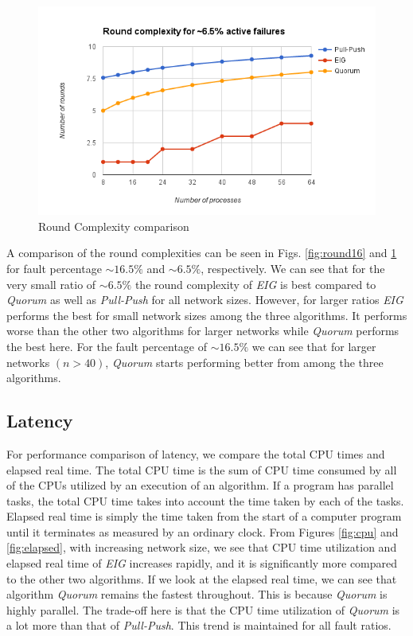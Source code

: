 \begin{figure}[ht] \centering \includegraphics[scale=0.4]{Round6}
    \caption{Round Complexity comparison} \label{fig:round6}
    \vspace{-4mm}
    \end{figure}

A comparison of the round complexities can be seen in Figs. \ref{fig:round16}
and \ref{fig:round6} for fault percentage $\mathtt{\sim}16.5\%$ and
$\mathtt{\sim}6.5\%$, respectively. We can see that for the very small ratio of
$\mathtt{\sim}6.5\%$ the round complexity of \textit{EIG} is best compared to
\textit{Quorum} as well as \textit{Pull-Push} for all network sizes. However,
for larger ratios \textit{EIG} performs the best for small network sizes among
the three algorithms. It performs worse than the other two algorithms for
larger networks while \textit{Quorum} performs the best here.  For the fault
percentage of $\mathtt{\sim}16.5\%$ we can see that for larger networks $(n
> 40)$, \textit{Quorum} starts performing better from among the three
algorithms.


\subsection{Latency}

For performance comparison of latency, we compare the total CPU times and
elapsed real time.  The total CPU time is the sum of CPU time consumed by all
of the CPUs utilized by an execution of an algorithm. If a program has parallel
tasks, the total CPU time takes into account the time taken by each of the
tasks. Elapsed real time is simply the time taken from the start of a computer
program until it terminates as measured by an ordinary clock. From Figures
\ref{fig:cpu} and \ref{fig:elapsed}, with increasing network size, we see that
CPU time utilization and elapsed real time of \textit{EIG} increases rapidly,
and it is significantly more compared to the other two algorithms. If we look
at the elapsed real time, we can see that algorithm \textit{Quorum} remains the
fastest throughout. This is because \textit{Quorum} is highly parallel. The
trade-off here is that the CPU time utilization of \textit{Quorum} is a lot
more than that of \textit{Pull-Push}. This trend is maintained for all fault
ratios.

